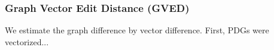 \subsubsection{\textbf{Graph Vector Edit Distance (GVED)}} We estimate the graph difference by vector difference. First, PDGs were vectorized...

